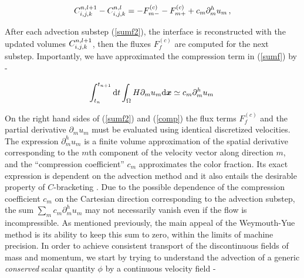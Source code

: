 \begin{align}
{C_{i,j,k}^{n,l+1} - C_{i,j,k}^{n,l}} = - F^{(c)}_{m-} - F^{(c)}_{m+} 
+ c_m \partial_{m}^h u_m \,,
\label{sumf2}
\end{align}



After each advection substep (\ref{sumf2}), the interface is reconstructed
with the updated volumes $C_{i,j,k}^{n,l+1}$, then the 
fluxes $F^{(c)}_{f}$ are computed for the next substep. 
Importantly, we have approximated the compression term in (\ref{sumf}) by -

\begin{align}
	\int_{t_n}^{t_{n+1}}  {\textrm {d}}t \int_\Omega  H \partial_m u_m  {\textrm {d}}\boldsymbol{x} \simeq  c_m 
 \partial_{m}^h u_m \, 
 \label{comp}
\end{align}


On the right hand sides of (\ref{sumf2}) and (\ref{comp}) 
the flux terms $F_{f}^{(c)}$ and the 
 partial derivative $\partial_{m} u_m$ must
be evaluated using identical discretized velocities.
The expression $\partial_{m}^h u_m$ is a finite volume approximation of the 
spatial derivative corresponding to the $m$th component 
of the velocity vector along direction $m$, and
the ``compression coefficient'' $c_m$ approximates the color fraction. 
Its exact expression is dependent on the advection method
and it also entails the desirable property of $C$-bracketing
. 
Due to the possible dependence of the 
compression coefficient $c_m$ on the Cartesian direction
corresponding to the advection substep, 
the sum $\sum_m c_m \partial_{m}^h u_m$ may not necessarily vanish
even if the flow is incompressible.
As mentioned previously, the main appeal of the Weymouth-Yue method 
is its ability to keep this sum to zero, within the limits of machine precision. 
In order to achieve consistent transport of the discontinuous fields 
of mass and momentum, we start by trying to understand the advection 
of a generic \textit{conserved} scalar quantity $\phi$ by a continuous velocity field - 


